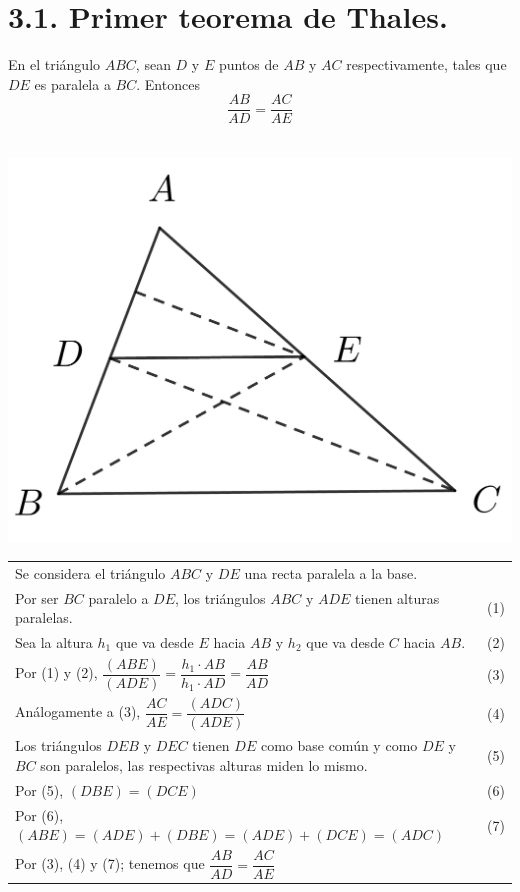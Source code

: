 \documentclass[12pt,a4paper, oneside]{book}
\begin{document}
\section{3.1. Primer teorema de Thales.}
En el triángulo $ABC$, sean $D$ y $E$ puntos de $AB$
y $AC$ respectivamente, tales que $DE$ es paralela a $BC$. Entonces $$\dfrac{AB}{AD}=\dfrac{AC}{AE}$$
\\
\begin{center}
\includegraphics[scale=0.6]{Imagenes/thales 1.png} 
\end{center}
\begin{tabular}{p{15.9cm}p{1cm}}
\\Se considera el triángulo $ABC$ y $DE$ una recta paralela a la base.
\\Por ser $BC$ paralelo a $DE$, los triángulos $ABC$ y $ADE$ tienen alturas paralelas. &(1)
\\Sea la altura $h_1$ que va desde $E$ hacia $AB$ y $h_2$ que va desde $C$ hacia $AB$. &(2)
\\Por (1) y (2), $\dfrac{(ABE)}{(ADE)}=\dfrac{h_1 \cdot AB }{h_1 \cdot AD}=\dfrac{AB}{AD}$ &(3)
\\Análogamente a (3), $\dfrac{AC}{AE}=\dfrac{(ADC)}{(ADE)}$ &(4)
\\Los triángulos $DEB$ y $DEC$ tienen  $DE$ como base común y como $DE$ y $BC$ son paralelos, las respectivas alturas miden lo mismo. &\medskip(5)
\\Por (5), $(DBE)= (DCE)$& (6)
\\Por (6), $(ABE)=(ADE)+(DBE)=(ADE)+ (DCE)= (ADC)$ & (7)
\\Por (3), (4) y (7); tenemos que $\dfrac{AB}{AD}=\dfrac{AC}{AE}$
\end{tabular}
\end{document}
